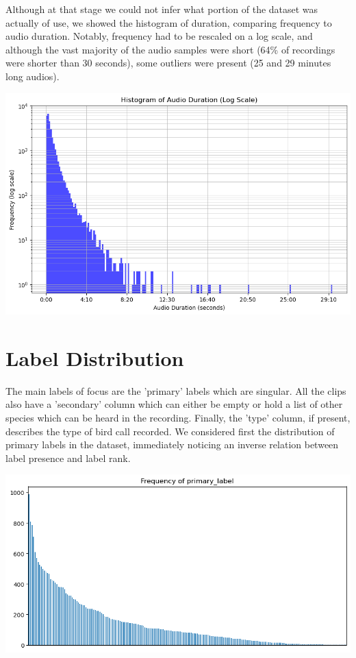 \documentclass[10pt]{article}
\begin{document}
\begin{minipage}{0.48\linewidth}
Although at that stage we could not infer what portion of the dataset was actually of use, we showed the histogram of duration, comparing frequency to audio duration. Notably, frequency had to be rescaled on a log scale, and although the vast majority of the audio samples were short (64\% of recordings were shorter than 30 seconds), some outliers were present (25 and 29 minutes long audios).
\end{minipage}
\hfill
\begin{minipage}{0.48\linewidth}
  \includegraphics[width=\linewidth]{img/training_duration_histogram.png}
\end{minipage}

\section*{Label Distribution}

\begin{minipage}{0.48\linewidth}
The main labels of focus are the 'primary' labels which are singular. All the clips also have a 'secondary' column which can either be empty or hold a list of other species which can be heard in the recording. Finally, the 'type' column, if present, describes the type of bird call recorded. We considered first the distribution of primary labels in the dataset, immediately noticing an inverse relation between label presence and label rank.
\end{minipage}
\hfill
\begin{minipage}{0.48\linewidth}
  \includegraphics[width=\linewidth]{img/train_primary_histogram.png}
\end{minipage}
\end{document}
